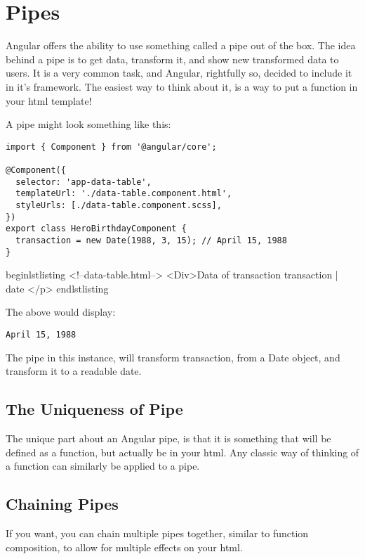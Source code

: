 \section{ Pipes }
\maketitle{}

Angular offers the ability to use something called a pipe out of the box. The
idea behind a pipe is to get data, transform it, and show new transformed data
to users. It is a very common task, and Angular, rightfully so, decided to
include it in it's framework. The easiest way to think about it, is a way
to put a function in your html template!

A pipe might look something like this:

\begin{lstlisting}
import { Component } from '@angular/core';

@Component({
  selector: 'app-data-table',
  templateUrl: './data-table.component.html',
  styleUrls: [./data-table.component.scss],
})
export class HeroBirthdayComponent {
  transaction = new Date(1988, 3, 15); // April 15, 1988
}
\end{lstlisting}

begin{lstlisting}
<!--data-table.html-->
<Div>Data of transaction {{ transaction | date }}</p>
end{lstlisting}

The above would display:
\begin{verbatim}
April 15, 1988
\end{verbatim}

The pipe in this instance, will transform transaction, from a Date object, and
transform it to a readable date.

\subsection{ The Uniqueness of Pipe }
The unique part about an Angular pipe, is that it is something that will be
defined as a function, but actually be in your html. Any classic way of
thinking of a function can similarly be applied to a pipe.

\subsection{Chaining Pipes}
If you want, you can chain multiple pipes together, similar to function
composition, to allow for multiple effects on your html.

